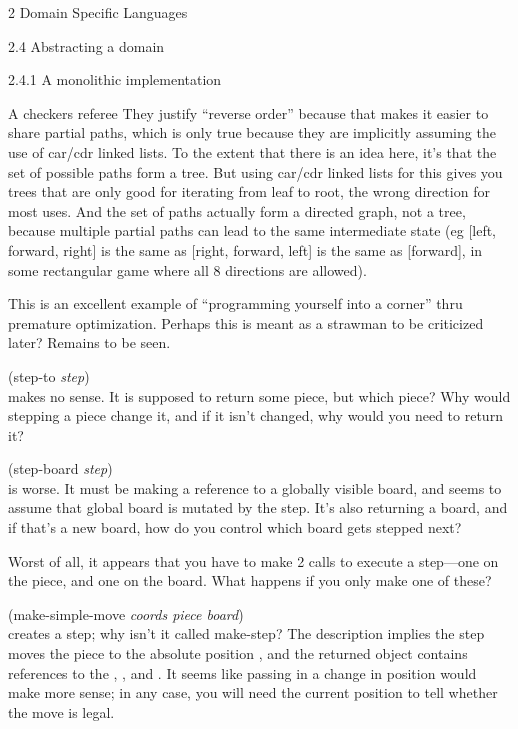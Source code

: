 \documentclass[12pt]{PalisadesLakesBook}
\begin{document}
\begin{plSection}{}
\begin{plSection}{2 Domain Specific Languages}
\begin{plSection}{2.4 Abstracting a domain}
\begin{plSection}{2.4.1 A monolithic implementation}
\begin{plSection}{A checkers referee}
They justify ``reverse order'' because that makes it easier
to share partial paths, which is only true because they are 
implicitly assuming the use of {\schemeFont car/cdr} linked lists.
To the extent that there is an idea here, it's that the set of
possible paths form a tree. 
But using {\schemeFont car/cdr} linked lists for this gives you
trees that are only good for iterating from leaf to root,
the wrong direction for most uses.
And the set of paths actually form a directed graph, not a tree,
because multiple partial paths can lead to the same intermediate
state (eg [left, forward, right] is the same as 
[right, forward, left] is the same as [forward],
in some rectangular game where all 8 directions are allowed).
 
This is an excellent example of 
``programming yourself into a corner'' 
thru premature optimization.
Perhaps this is meant as a strawman to be criticized later?
Remains to be seen.

{\schemeFont (step-to {\itshape step})}\\
makes no sense.
It is supposed to return some piece, but which piece?
Why would stepping a piece change it, and if it isn't changed,
why would you need to return it?

{\schemeFont (step-board {\itshape{step}})}\\
is worse.
It must be making a reference to a globally visible 
{\schemeFont board}, and seems to assume that global board
is mutated by the step.
It's also returning a board, and if that's a new board,
how do you control which board gets stepped next?

Worst of all, it appears that you have to make 2 calls
to execute a step---one on the piece, and one on the board.
What happens if you only make one of these?

{\schemeFont (make-simple-move {\itshape coords piece board})}\\
creates a step; why isn't it called {\schemeFont make-step}?
The description implies the step moves the piece to the
absolute position {},
and the returned object contains references to the 
{},
{},
and {}.
It seems like passing in a change in position 
would make more sense;
in any case, you will need the current position to tell
whether the move is legal.


\end{plSection}
\end{plSection}
\end{plSection}
\end{plSection}
\end{plSection}
\end{document}
